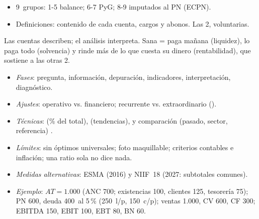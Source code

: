 \documentclass{article}
\begin{document}
\begin{columnas}
\begin{itemize}
\item 9~grupos: 1-5 balance; 6-7 PyG; 8-9 imputados al PN (ECPN).
\item Definiciones: contenido de cada cuenta, cargos y abonos. Las 2, voluntarias.
\end{itemize}

\begin{ideaclave}
Las cuentas describen; el análisis interpreta. Sana = paga mañana (liquidez), lo paga todo (solvencia) y rinde más de lo que cuesta su dinero (rentabilidad), que sostiene a las otras 2.
\end{ideaclave}
\begin{itemize}
\item \emph{Fases}: pregunta, información, depuración, indicadores, interpretación, diagnóstico.
\item \emph{Ajustes}: operativo vs. financiero; recurrente vs. extraordinario ().
\item \emph{Técnicas}:  (\% del total),  (tendencias),  y comparación (pasado, sector, referencia) .
\item \emph{Límites}: sin óptimos universales; foto maquillable; criterios contables e inflación; una ratio sola no dice nada.
\item \emph{Medidas alternativas}: ESMA (2016) y NIIF~18 (2027: subtotales comunes).
\item \emph{Ejemplo}: $AT=1.000$ (ANC 700; existencias 100, clientes 125, tesorería 75); PN 600, deuda 400~al 5\,\% (250~l/p, 150~c/p); ventas 1.000, CV 600, CF 300; EBITDA 150, EBIT 100, EBT 80, BN 60.
\end{itemize}


\end{columnas}
\end{document}
